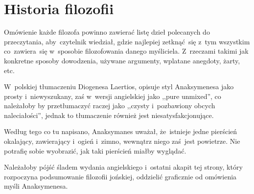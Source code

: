 \documentclass[a4paper,11pt]{article}
\begin{document}
\vspace{\spaceTwo}





\newpage
\section{Historia filozofii}

\vspace{\spaceTwo}






\noi {}

\vspace{\spaceFour}

\start Omówienie każde filozofa powinno zawierać listę dzieł
polecanych do przeczytania, aby~czytelnik wiedział, gdzie najlepiej
zetknąć~się z~tym wszystkim co~zawiera~się w~sposobie filozofowania
danego myśliciela. Z~rzeczami takimi jak konkretne sposoby dowodzenia,
używane argumenty, wplatane anegdoty, żarty, etc.

\vspace{\spaceThree}


\noi {}

\vspace{\spaceFour}

\start {} W~polskiej tłumaczeniu Diogenesa Laertios, opisuje
styl Anaksymenesa jako prosty i~niewyszukany, zaś w~wersji angielskiej
jako ,,pure unmixed'', co należałoby by przetłumaczyć raczej jako
,,czysty i~pozbawiony obcych naleciałości'', jednak to tłumaczenie
również jest niesatysfakcjonujące.

\vspace{\spaceFour}


\start {} Według tego co tu napisano, Anaksymanes uważał,
że~istnieje jedne pierścień okalający, zawierający i~ogień i~zimno,
wewnątrz niego zaś~jest powietrze. Nie potrafię sobie wyobrazić, jak
taki pierścień miałby wyglądać.

\vspace{\spaceFour}


\start {} Należałoby pójść śladem wydania angielskiego i~ostatni
akapit tej strony, który rozpoczyna podsumowanie filozofii jońskiej,
oddzielić graficznie od omówienia myśli Anaksymenesa.
\end{document}
